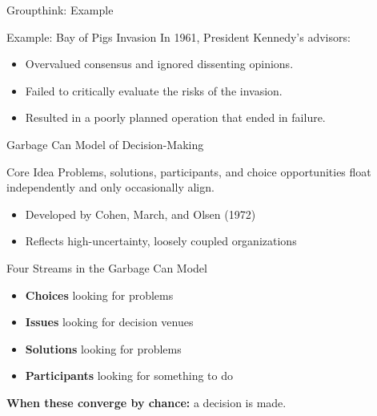 \documentclass[10pt]{beamer}
\begin{document}
\begin{frame}{Groupthink: Example}
\begin{block}{Example: Bay of Pigs Invasion}
In 1961, President Kennedy's advisors:
\begin{itemize}
  \item Overvalued consensus and ignored dissenting opinions.
  \item Failed to critically evaluate the risks of the invasion.
  \item Resulted in a poorly planned operation that ended in failure.
\end{itemize}
\end{block}
\end{frame} 

\begin{frame}{Garbage Can Model of Decision-Making}
\begin{block}{Core Idea}
Problems, solutions, participants, and choice opportunities float independently and only occasionally align.
\end{block}
\begin{itemize}
  \item Developed by Cohen, March, and Olsen (1972)
  \item Reflects high-uncertainty, loosely coupled organizations
\end{itemize}
\end{frame}

\begin{frame}{Four Streams in the Garbage Can Model}
\begin{itemize}
  \item \textbf{Choices} looking for problems
  \item \textbf{Issues} looking for decision venues
  \item \textbf{Solutions} looking for problems
  \item \textbf{Participants} looking for something to do
\end{itemize}
\textbf{When these converge by chance:} a decision is made.
\end{frame}
\end{document}
